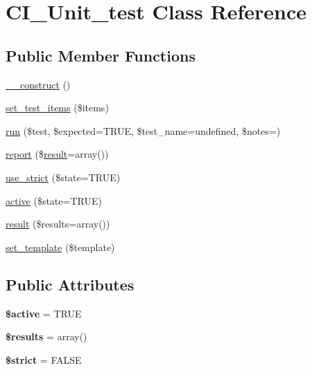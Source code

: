 \hypertarget{class_c_i___unit__test}{}\section{C\+I\+\_\+\+Unit\+\_\+test Class Reference}
\label{class_c_i___unit__test}
\subsection*{Public Member Functions}
\begin{DoxyCompactItemize}
\item 
\mbox{\hyperlink{class_c_i___unit__test_a7bb42eb0a8066d4941c7bc03cb75c226}{\+\_\+\+\_\+construct}} ()
\item 
\mbox{\hyperlink{class_c_i___unit__test_ae998e825a44a7a477d0e772becca5c84}{set\+\_\+test\+\_\+items}} (\$items)
\item 
\mbox{\hyperlink{class_c_i___unit__test_adf0dafbc83a2de7807a255bd95706798}{run}} (\$test, \$expected=T\+R\+UE, \$test\+\_\+name=\textquotesingle{}undefined\textquotesingle{}, \$notes=\textquotesingle{}\textquotesingle{})
\item 
\mbox{\hyperlink{class_c_i___unit__test_a665957133851ee9dfa906539a3d2f5ea}{report}} (\$\mbox{\hyperlink{class_c_i___unit__test_abbf6e7425a54cb379268cd5f71b478b6}{result}}=array())
\item 
\mbox{\hyperlink{class_c_i___unit__test_ae8cd59e389e6184672312bb9bc6b8e38}{use\+\_\+strict}} (\$state=T\+R\+UE)
\item 
\mbox{\hyperlink{class_c_i___unit__test_ae38eaa1f6b4bb147adf2c9722cff9b05}{active}} (\$state=T\+R\+UE)
\item 
\mbox{\hyperlink{class_c_i___unit__test_abbf6e7425a54cb379268cd5f71b478b6}{result}} (\$results=array())
\item 
\mbox{\hyperlink{class_c_i___unit__test_aacb2f6b783d7939fcbf436498e1bfc52}{set\+\_\+template}} (\$template)
\end{DoxyCompactItemize}
\subsection*{Public Attributes}
\begin{DoxyCompactItemize}
\item 
\mbox{\label{class_c_i___unit__test_a5dd3c302ffa6b23b4e7c12f5d22a1370}} 
{\bfseries \$active} = T\+R\+UE
\item 
\mbox{\label{class_c_i___unit__test_a2a6f8e6f0c57fac3e8026f6486f9c240}} 
{\bfseries \$results} = array()
\item 
\mbox{\label{class_c_i___unit__test_a9a9b3176725ab72d0222a360ecefcae2}} 
{\bfseries \$strict} = F\+A\+L\+SE
\end{DoxyCompactItemize}
